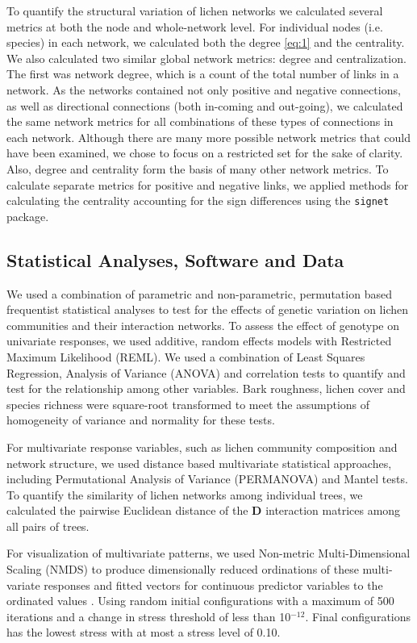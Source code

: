 \documentclass[11pt,twocolumn,twoside,lineno]{pnas-new}
\begin{document}
{To quantify the structural variation of lichen networks we calculated
several metrics at both the node and whole-network level. For
individual nodes (i.e. species) in each network, we calculated both
the degree \eqref{eq:1} and the centrality. We also calculated two
similar global network metrics: degree and centralization. The first
was network degree, which is a count of the total number of links in a
network. As the networks contained not only positive and negative
connections, as well as directional connections (both in-coming and
out-going), we calculated the same network metrics for all
combinations of these types of connections in each network. Although
there are many more possible network metrics that could have been
examined, we chose to focus on a restricted set for the sake of
clarity. Also, degree and centrality form the basis of many other
network metrics. To calculate separate metrics for positive and
negative links, we applied methods for calculating the centrality
accounting for the sign differences \cite{Everett2014NetworksTies}
using the \texttt{signet} package.


\subsection*{Statistical Analyses, Software and Data}

We used a combination of parametric and non-parametric, permutation
based frequentist statistical analyses to test for the effects of
genetic variation on lichen communities and their interaction
networks. To assess the effect of genotype on univariate responses, we
used additive, random effects models with Restricted Maximum
Likelihood (REML). We used a combination of Least Squares Regression,
Analysis of Variance (ANOVA) and correlation tests to quantify and
test for the relationship among other variables. Bark roughness,
lichen cover and species richness were square-root transformed to meet
the assumptions of homogeneity of variance and normality for these
tests.

For multivariate response variables, such as lichen community
composition and network structure, we used distance based multivariate
statistical approaches, including Permutational Analysis of Variance
(PERMANOVA) and Mantel tests. To quantify the similarity of lichen
networks among individual trees, we calculated the pairwise Euclidean
distance of the $\mathbf{D}$ interaction matrices among all pairs of
trees.

For visualization of multivariate patterns, we used Non-metric
Multi-Dimensional Scaling (NMDS) \cite{ecodist} to produce
dimensionally reduced ordinations of these multi-variate responses and
fitted vectors for continuous predictor variables to the ordinated
values \cite{vegan}. Using random initial configurations with a
maximum of 500 iterations and a change in stress threshold of less
than 10$^{-12}$. Final configurations has the lowest stress with at
most a stress level of 0.10.

}
\end{document}
